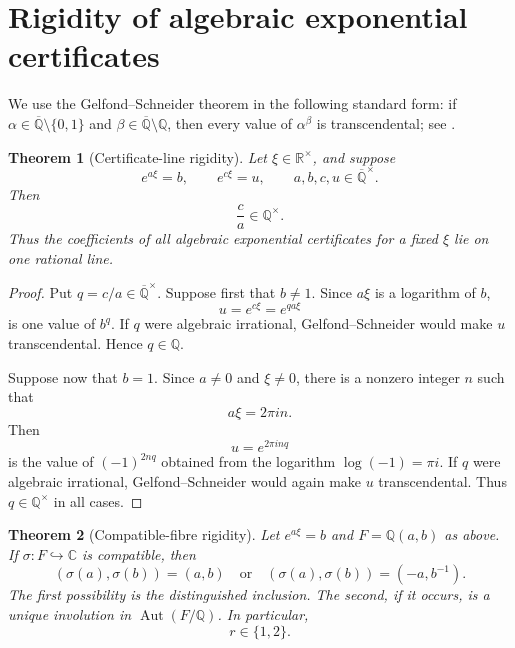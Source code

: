 \documentclass[11pt]{article}
\newcommand{\CC}{\mathbb C}
\newcommand{\RR}{\mathbb R}
\newcommand{\QQ}{\mathbb Q}
\newcommand{\Qbar}{\overline{\mathbb Q}}
\DeclareMathOperator{\Aut}{Aut}
\newtheorem{theorem}{Theorem}[section]
\theoremstyle{definition}
\theoremstyle{remark}
\numberwithin{equation}{section}
\begin{document}
\section{Rigidity of algebraic exponential certificates}\label{sec:rigidity}

We use the Gelfond--Schneider theorem in the following standard form:
if $\alpha\in\Qbar\setminus\{0,1\}$ and
$\beta\in\Qbar\setminus\QQ$, then every value of $\alpha^\beta$ is
transcendental; see \cite[Chapter~1]{Baker1975}.

\begin{theorem}[Certificate-line rigidity]\label{thm:certificate-line}
Let $\xi\in\RR^\times$, and suppose
\[
 e^{a\xi}=b,
 \qquad
 e^{c\xi}=u,
 \qquad
 a,b,c,u\in\Qbar^\times.
\]
Then
\[
 \boxed{\frac ca\in\QQ^\times.}
\]
Thus the coefficients of all algebraic exponential certificates for a
fixed $\xi$ lie on one rational line.
\end{theorem}

\begin{proof}
Put $q=c/a\in\Qbar^\times$.  Suppose first that $b\ne1$.  Since
$a\xi$ is a logarithm of $b$,
\[
 u=e^{c\xi}=e^{q a\xi}
\]
is one value of $b^q$.  If $q$ were algebraic irrational,
Gelfond--Schneider would make $u$ transcendental.  Hence $q\in\QQ$.

Suppose now that $b=1$.  Since $a\ne0$ and $\xi\ne0$, there is a
nonzero integer $n$ such that
\[
 a\xi=2\pi i n.
\]
Then
\[
 u=e^{2\pi i n q}
\]
is the value of $(-1)^{2nq}$ obtained from the logarithm
$\log(-1)=\pi i$.  If $q$ were algebraic irrational,
Gelfond--Schneider would again make $u$ transcendental.  Thus
$q\in\QQ^\times$ in all cases.
\end{proof}

\begin{theorem}[Compatible-fibre rigidity]\label{thm:compatible-rigidity}
Let $e^{a\xi}=b$ and $F=\QQ(a,b)$ as above.  If
$\sigma:F\hookrightarrow\CC$ is compatible, then
\[
 \boxed{
  (\sigma(a),\sigma(b))=(a,b)
  \quad\text{or}\quad
  (\sigma(a),\sigma(b))=(-a,b^{-1}).}
\]
The first possibility is the distinguished inclusion.  The second, if it
occurs, is a unique involution in $\Aut(F/\QQ)$.  In particular,
\[
 \boxed{r\in\{1,2\}.}
\]
\end{theorem}
\end{document}
